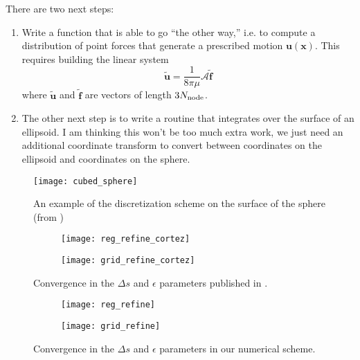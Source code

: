 \documentclass{article}
\newcommand{\tn}{\textnormal}
\begin{document}
There are two next steps:
\begin{enumerate}
\item Write a function that is able to go ``the other way,'' i.e. to
  compute a distribution of point forces that generate a prescribed
  motion $\mathbf{u}(\mathbf{x})$. This requires building the linear
  system
  \begin{equation}
    \label{eq:linear-system}
    \tilde{\mathbf{u}} = \frac{1}{8\pi\mu} \mathcal{A} \tilde{\mathbf{f}}
  \end{equation}
  where $\tilde{\mathbf{u}}$ and $\tilde{\mathbf{f}}$ are vectors of
  length $3N_\tn{node}$.
\item The other next step is to write a routine that integrates over
  the surface of an ellipsoid. I am thinking this won't be too much
  extra work, we just need an additional coordinate transform to
  convert between coordinates on the ellipsoid and coordinates on the
  sphere. 
\end{enumerate}

\begin{figure}
  \centering
  \texttt{[image: cubed\_sphere]}
  \caption{An example of the discretization scheme on the surface of
    the sphere (from \cite{Portelenelle2018})}
  \label{fig:discretization}
\end{figure}

\begin{figure}
  \centering
  \begin{subfigure}{0.6\textwidth}
    \texttt{[image: reg\_refine\_cortez]}
  \end{subfigure}
  \hfill
  \begin{subfigure}{0.35\textwidth}
    \texttt{[image: grid\_refine\_cortez]}
  \end{subfigure}
  \caption{Convergence in the $\Delta s$ and $\epsilon$ parameters
    published in \cite{Cortez2005}.}
  \label{fig:cortez-conv}
\end{figure}

\begin{figure}
  \centering
  \begin{subfigure}{0.48\textwidth}
    \texttt{[image: reg\_refine]}
  \end{subfigure}
  \hfill
  \begin{subfigure}{0.48\textwidth}
    \texttt{[image: grid\_refine]}
  \end{subfigure}
  \caption{Convergence in the $\Delta s$ and $\epsilon$ parameters in
    our numerical scheme.}
  \label{fig:our-conv}
\end{figure}
\end{document}
